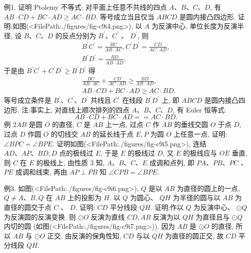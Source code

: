 例1. 证明 Ptolemy 不等式:
对平面上任意不共线的四点 $A 、 B 、 C 、 D$, 有 $A B \cdot C D+B C \cdot A D \geqslant A C \cdot B D$. 等号成立当且仅当 $A B C D$ 是圆内接凸四边形.
证明:如图(<FilePath:./figures/fig-c9i4.png>), 以 $A$ 为反演中心, 单位长度为反演半径, 设 $B 、 C 、 D$ 的反点分别为 $B^{\prime} 、 C^{\prime}$ 、 $D^{\prime}$, 则
$$
\begin{gathered}
B^{\prime} C^{\prime}=\frac{B C}{A B \cdot A C}, C^{\prime} D^{\prime}=\frac{C D}{A C \cdot A D}, \\
B^{\prime} D^{\prime}=\frac{B D}{A B \cdot \bar{A} D},
\end{gathered}
$$
于是由 $B^{\prime} C^{\prime}+C^{\prime} D^{\prime} \geqslant B^{\prime} D^{\prime}$ 得
$$
\begin{aligned}
& \frac{B C}{A B \cdot A C}+\frac{C D}{A C \cdot A D} \geqslant \frac{B D}{A B \cdot A D}, \\
& A B \cdot C D+B C \cdot A D \geqslant A C \cdot B D .
\end{aligned}
$$
等号成立条件是 $B^{\prime} 、 C^{\prime} 、 D^{\prime}$ 共线且 $C^{\prime}$ 在线段 $B^{\prime} D^{\prime}$ 上, 即 $A B C D$ 是圆内接凸四边形.
注:事实上, 对直线上顺次排列的四点 $A 、 B 、 C 、 D$, 有 Euler 恒等式:
$$
A B \cdot C D+B C \cdot A D==A C \cdot B D .
$$
例 $2 A B$ 是圆 $O$ 的直径, $C$ 是 $A B$ 上一点, 过点 $C$ 作 $A B$ 的垂线交圆 $O$ 于点 $D$, 过点 $D$ 作圆 $O$ 的切线交 $A B$ 的延长线于点 $E, P$ 为圆 $O$ 上任意一点, 证明: $\angle B P C=\angle B P E$.
证明如图(<FilePath:./figures/fig-c9i5.png>), 连结 $A D 、 A P 、 B D, D$ 点的极线过 $E$, 于是 $E$ 的极线过 $D$, 又 $E$ 的极线应与 $O E$ 垂直, 则 $C$ 在 $E$ 的极线上, 由性质 3 知, $A 、 B 、 C 、 E$ 成调和点列, 即 $P A 、 P B 、 P C$ 、 $P E$ 成调和线束, 再由 $A P \perp P B$ 知 $\angle C P B= \angle B P E$.



例3. 如图(<FilePath:./figures/fig-c9i6.png>), $Q$ 是以 $A B$ 为直径的圆上的一点, $Q \neq A 、 B, Q$ 在 $A B$ 上的投影为 $H$. 以 $Q$ 为圆心、 $Q H$ 为半径的圆与以 $A B$ 为直径的圆交于点 $C$ 、 $D$. 证明: $C D$ 平分线段 $Q H$. 
证明:作以 $Q$ 为反演中心、 $\odot Q$ 为反演圆的反演变换.
则 $\odot O$ 反演为直线 $C D, A B$ 反演为以 $Q H$ 为直径且与 $\odot Q$ 内切的圆 (如图(<FilePath:./figures/fig-c9i7.png>)).
因为 $A B$ 是 $\odot O$ 的直径, 所以 $A B$ 与 $\odot O$ 正交.
由反演的保角性知, $C D$ 与以 $Q H$ 为直径的圆正交, 故 $C D$ 平分线段 $Q H$.



